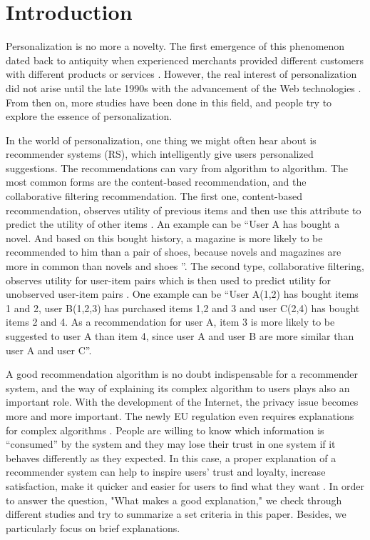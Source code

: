 \section{Introduction}

  \indent Personalization is no more a novelty. The first emergence of this phenomenon dated back to antiquity
  when experienced merchants provided different customers with different products or services \cite{adomavicius2008personalization}. However, the real interest of personalization did not arise until the late 1990s with the advancement of the Web technologies \cite{don2011managing}.
  From then on, more studies have been done in this field, and people try to explore the essence of personalization.

  \indent In the world of personalization, one thing we might often hear about is recommender systems (RS), which intelligently give users personalized suggestions. The recommendations can vary from algorithm to algorithm. The most common forms are the content-based recommendation, and the collaborative filtering recommendation. The first one, content-based recommendation, observes utility of previous items and then use this attribute to predict the utility of other items \cite{balabanovic1997fab}. An example can be ``User A has bought a novel. And based on this bought history, a magazine is more likely to be recommended to him than a pair of shoes, because novels and magazines are more in common than novels and shoes ''. The second type, collaborative filtering, observes utility for user-item pairs which is then used to predict utility for unobserved user-item pairs \cite{balabanovic1997fab}. One example can be ``User A(1,2) has bought items 1 and 2, user B(1,2,3) has purchased items 1,2 and 3 and user C(2,4) has bought items 2 and 4. As a recommendation for user A, item 3 is more likely to be suggested to user A than item 4, since user A and user B are more similar than user A and user C''.

  \indent A good recommendation algorithm is no doubt indispensable for a recommender system, and the way of explaining its complex algorithm to users
  plays also an important role. With the development of the Internet, the privacy issue becomes more and more important. The newly EU regulation even requires explanations for complex algorithms \cite{goodman2016european}. People are willing to know which information is ``consumed'' by the system and they may lose their trust in one system if it behaves differently as they expected. 
  In this case, a proper explanation of a recommender system can help to inspire users' trust and loyalty, increase satisfaction, make it quicker and easier for users to find what they want \cite{tintarev2007survey}. In order to answer the question, "What makes a good explanation," we check through different studies and try to summarize a set criteria in this paper. Besides, we particularly focus on brief explanations.

